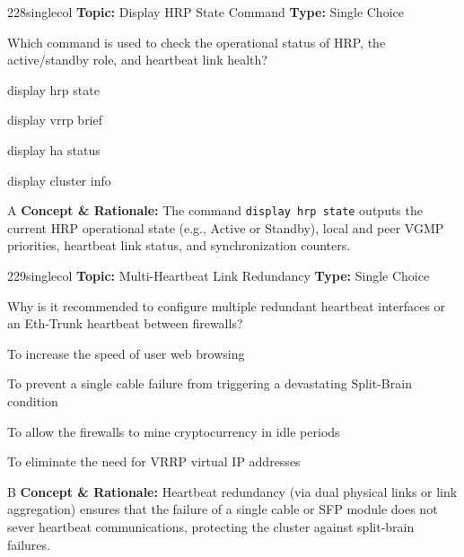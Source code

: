 \begin{qcard}{228}{singlecol}
\textcolor{darkslate!75}{\small\textbf{Topic:} Display HRP State Command \hfill \textbf{Type:} Single Choice}\vspace{0.4em}\par
Which command is used to check the operational status of HRP, the active/standby role, and heartbeat link health?
\begin{qoptions}
\item display hrp state
\item display vrrp brief
\item display ha status
\item display cluster info
\end{qoptions}
\end{qcard}
\nopagebreak
\begin{explainbox}{A}
\textbf{Concept \& Rationale:} The command \texttt{display hrp state} outputs the current HRP operational state (e.g., Active or Standby), local and peer VGMP priorities, heartbeat link status, and synchronization counters.
\end{explainbox}

\begin{qcard}{229}{singlecol}
\textcolor{darkslate!75}{\small\textbf{Topic:} Multi-Heartbeat Link Redundancy \hfill \textbf{Type:} Single Choice}\vspace{0.4em}\par
Why is it recommended to configure multiple redundant heartbeat interfaces or an Eth-Trunk heartbeat between firewalls?
\begin{qoptions}
\item To increase the speed of user web browsing
\item To prevent a single cable failure from triggering a devastating Split-Brain condition
\item To allow the firewalls to mine cryptocurrency in idle periods
\item To eliminate the need for VRRP virtual IP addresses
\end{qoptions}
\end{qcard}
\nopagebreak
\begin{explainbox}{B}
\textbf{Concept \& Rationale:} Heartbeat redundancy (via dual physical links or link aggregation) ensures that the failure of a single cable or SFP module does not sever heartbeat communications, protecting the cluster against split-brain failures.
\end{explainbox}

